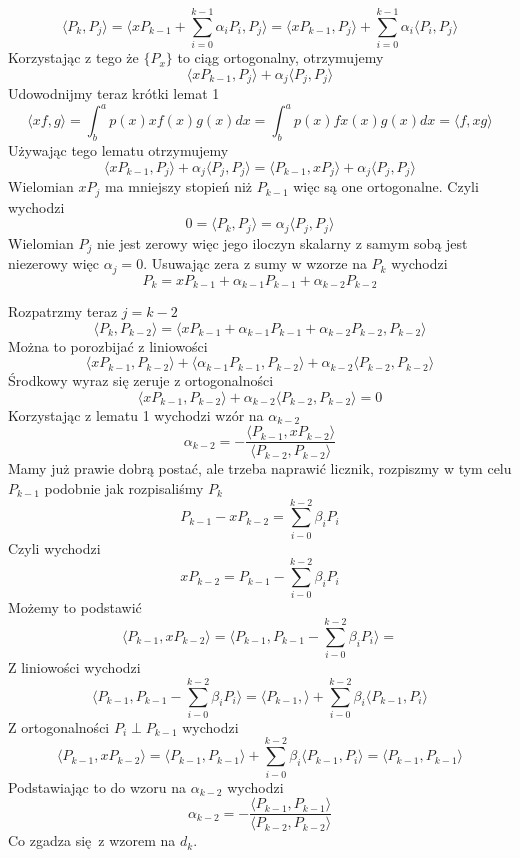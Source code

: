 \documentclass{article}
\begin{document}
\[
    \langle P_k , P_j \rangle = \langle x P_{k-1} + \sum_{i=0}^{k-1} \alpha_i P_i , P_j \rangle = \langle x P_{k-1} , P_j \rangle + \sum_{i=0}^{k-1} \alpha_i \langle P_i , P_j \rangle 
\]
Korzystając z tego że $ \{ P_x \} $ to ciąg ortogonalny, otrzymujemy
\[
    \langle x P_{k-1} , P_j \rangle + \alpha_j \langle P_j, P_j \rangle   
\]
Udowodnijmy teraz krótki lemat 1
\[ 
    \langle x f , g \rangle = \int_b^a p(x) x f (x) g(x) dx = \int_b^a p(x) f x (x) g(x) dx = \langle f , x g \rangle 
\] 
Używając tego lematu otrzymujemy
\[
     \langle x P_{k-1} , P_j \rangle + \alpha_j \langle P_j, P_j \rangle = \langle  P_{k-1} , x P_j \rangle + \alpha_j \langle P_j, P_j \rangle 
\]
Wielomian $x P_j$ ma mniejszy stopień niż $P_{k-1}$ więc są one ortogonalne. Czyli wychodzi
\[
   0 = \langle P_k , P_j \rangle = \alpha_j \langle P_j, P_j \rangle 
\]
Wielomian $P_j$ nie jest zerowy więc jego iloczyn skalarny z samym sobą jest niezerowy więc $\alpha_j = 0$. Usuwając zera z sumy w wzorze na $P_k$ wychodzi
\[ P_k = x P_{k-1} + \alpha_{k-1} P_{k-1} + \alpha_{k-2} P_{k-2}\]

Rozpatrzmy teraz $j = k-2$
\[ 
    \langle P_k , P_{k-2} \rangle = \langle x P_{k-1} + \alpha_{k-1} P_{k-1} + \alpha_{k-2} P_{k-2} , P_{k-2} \rangle 
\]
Można to porozbijać z liniowości
\[
    \langle x  P_{k-1}, P_{k-2} \rangle + \langle \alpha_{k-1} P_{k-1}, P_{k-2} \rangle +\alpha_{k-2}  \langle P_{k-2} , P_{k-2} \rangle 
\]
Środkowy wyraz się zeruje z ortogonalności
\[
    \langle x P_{k-1}, P_{k-2}  \rangle + \alpha_{k-2} \langle  P_{k-2} , P_{k-2} \rangle = 0
\]
Korzystając z lematu 1 wychodzi wzór na $\alpha_{k-2}$
\[
    \alpha_{k-2} = - \frac{\langle  P_{k-1}, x P_{k-2}  \rangle}{\langle  P_{k-2} , P_{k-2} \rangle }
\]
Mamy już prawie dobrą postać, ale trzeba naprawić licznik, rozpiszmy w tym celu $P_{k-1}$ podobnie jak rozpisaliśmy $P_{k}$
\[ P_{k-1} - x P_{k-2}  =  \sum_{i-0}^{k-2} \beta_i P_i \]
Czyli wychodzi 
\[ x P_{k-2}  =P_{k-1} - \sum_{i-0}^{k-2} \beta_i P_i \]
Możemy to podstawić
\[
    \langle  P_{k-1}, x P_{k-2}  \rangle = \langle P_{k-1} , P_{k-1} - \sum_{i-0}^{k-2} \beta_i P_i \rangle = 
\]
Z liniowości wychodzi
\[
    \langle P_{k-1} , P_{k-1} - \sum_{i-0}^{k-2} \beta_i P_i \rangle = 
    \langle   P_{k-1} , \rangle + \sum_{i-0}^{k-2} \beta_i \langle  P_{k-1}, P_i \rangle
\]
Z ortogonalności $P_i \perp P_{k-1}$ wychodzi
\[
    \langle  P_{k-1}, x P_{k-2}  \rangle = \langle   P_{k-1} ,P_{k-1} \rangle + \sum_{i-0}^{k-2} \beta_i \langle  P_{k-1}, P_i \rangle = \langle P_{k-1}, P_{k-1}  \rangle
\]
Podstawiając to do wzoru na $\alpha_{k-2}$ wychodzi
\[
    \alpha_{k-2} = - \frac{\langle  P_{k-1},  P_{k-1}  \rangle}{\langle  P_{k-2} , P_{k-2} \rangle }
\]
Co zgadza się z wzorem na $d_k$.
\end{document}
